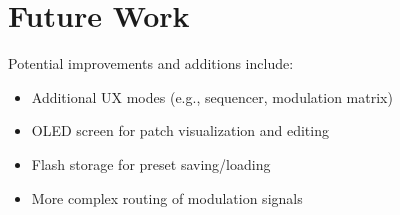 \section{Future Work}
Potential improvements and additions include:
\begin{itemize}
    \item Additional UX modes (e.g., sequencer, modulation matrix)
    \item OLED screen for patch visualization and editing
    \item Flash storage for preset saving/loading
    \item More complex routing of modulation signals
\end{itemize}
